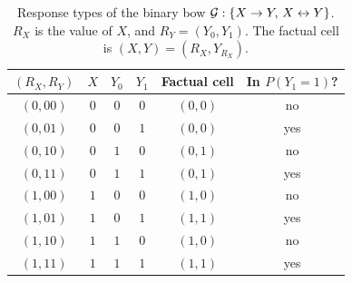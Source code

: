 \begin{table}[ht]
\centering
\caption{Response types of the binary bow $\mathcal{G}:\{X\to Y,\, X\leftrightarrow Y\}$.
$R_X$ is the value of $X$, and $R_Y=(Y_0,Y_1)$. The factual cell is
$(X,Y)=(R_X,Y_{R_X})$.}
\label{tab:types}
\small
\begin{tabular}{@{}cccccc@{}}
\toprule
$(R_X,R_Y)$ & $X$ & $Y_0$ & $Y_1$ & Factual cell & In $P(Y_1{=}1)$? \\
\midrule
$(0,00)$ & $0$ & $0$ & $0$ & $(0,0)$ & no \\
$(0,01)$ & $0$ & $0$ & $1$ & $(0,0)$ & yes \\
$(0,10)$ & $0$ & $1$ & $0$ & $(0,1)$ & no \\
$(0,11)$ & $0$ & $1$ & $1$ & $(0,1)$ & yes \\
$(1,00)$ & $1$ & $0$ & $0$ & $(1,0)$ & no \\
$(1,01)$ & $1$ & $0$ & $1$ & $(1,1)$ & yes \\
$(1,10)$ & $1$ & $1$ & $0$ & $(1,0)$ & no \\
$(1,11)$ & $1$ & $1$ & $1$ & $(1,1)$ & yes \\
\bottomrule
\end{tabular}
\end{table}

